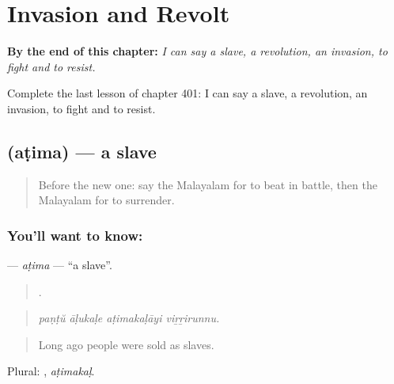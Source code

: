 
\chapter{Invasion and Revolt}
\label{ch:ml-invasion-and-revolt}

\begin{chapteropening}
\textbf{By the end of this chapter:} \emph{I can say a slave, a revolution, an invasion, to fight and to resist.}

Complete the last lesson of chapter 401: I can say a slave, a revolution, an invasion, to fight and to resist.
\end{chapteropening}

\section[\texorpdfstring{\ml{അടിമ} (aṭima)}{അടിമ (aṭima)}]{ (aṭima) — a slave}

\label{lesson:ML-C401-atima}



\begin{quote}
Before the new one: say the Malayalam for to beat in battle, then the Malayalam for to surrender.
\end{quote}

\subsection*{You'll want to know: }
\textbf{} — \emph{aṭima} — \textquotedblleft{}a slave\textquotedblright{}.

\begin{quote}
   .
\end{quote}

\begin{quote}
\emph{paṇṭŭ āḷukaḷe aṭimakaḷāyi viṟṟirunnu.}
\end{quote}

\begin{quote}
Long ago people were sold as slaves.
\end{quote}

Plural: , \emph{aṭimakaḷ}.

